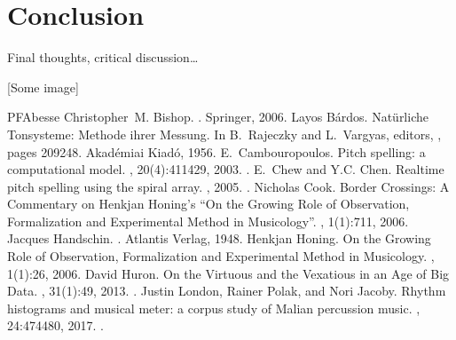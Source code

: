 \documentclass[letterpaper,10pt,english]{sphinxmanual}
\begin{document}
\chapter{Conclusion}
\label{\detokenize{conclusion:conclusion}}\label{\detokenize{conclusion::doc}}
Final thoughts, critical discussion…

{[}Some image{]}



\begin{sphinxthebibliography}{PFAbesse}
Christopher M. Bishop. . Springer, 2006.
Layos Bárdos. Natürliche Tonsysteme: Methode ihrer Messung. In B. Rajeczky and L. Vargyas, editors, , pages 209\textendash{}\textendash{}248. Akadémiai Kiadó, 1956.
E. Cambouropoulos. Pitch spelling: a computational model. , 20(4):411\textendash{}429, 2003. .
E. Chew and Y.\sphinxhyphen{}C. Chen. Real\sphinxhyphen{}time pitch spelling using the spiral array. , 2005. .
Nicholas Cook. Border Crossings: A Commentary on Henkjan Honing’s “On the Growing Role of Observation, Formalization and Experimental Method in Musicology”. , 1(1):7\textendash{}11, 2006.
Jacques Handschin. . Atlantis Verlag, 1948.
Henkjan Honing. On the Growing Role of Observation, Formalization and Experimental Method in Musicology. , 1(1):2\textendash{}6, 2006.
David Huron. On the Virtuous and the Vexatious in an Age of Big Data. , 31(1):4\textendash{}9, 2013. .
Justin London, Rainer Polak, and Nori Jacoby. Rhythm histograms and musical meter: a corpus study of Malian percussion music. , 24:474\textendash{}480, 2017. .

\end{sphinxthebibliography}
\end{document}
